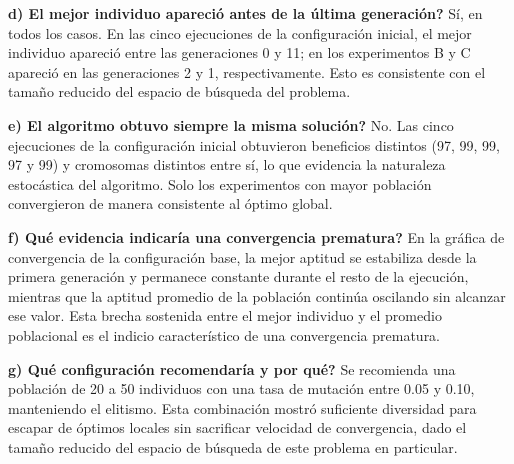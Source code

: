 \documentclass[12pt,a4paper]{article}
\begin{document}
\textbf{d) \textquestiondown El mejor individuo apareci\'{o} antes de la \'{u}ltima generaci\'{o}n?}
S\'{i}, en todos los casos. En las cinco ejecuciones de la configuraci\'{o}n
inicial, el mejor individuo apareci\'{o} entre las generaciones 0 y 11;
en los experimentos B y C apareci\'{o} en las generaciones 2 y 1,
respectivamente. Esto es consistente con el tama\~{n}o reducido del
espacio de b\'{u}squeda del problema.

\textbf{e) \textquestiondown El algoritmo obtuvo siempre la misma soluci\'{o}n?} No. Las
cinco ejecuciones de la configuraci\'{o}n inicial obtuvieron beneficios
distintos (97, 99, 99, 97 y 99) y cromosomas distintos entre s\'{i}, lo
que evidencia la naturaleza estoc\'{a}stica del algoritmo. Solo los
experimentos con mayor poblaci\'{o}n convergieron de manera consistente
al \'{o}ptimo global.

\textbf{f) \textquestiondown Qu\'{e} evidencia indicar\'{i}a una convergencia
prematura?} En la gr\'{a}fica de
convergencia de la configuraci\'{o}n base, la mejor aptitud se
estabiliza desde la primera generaci\'{o}n y permanece constante durante
el resto de la ejecuci\'{o}n, mientras que la aptitud promedio de la
poblaci\'{o}n contin\'{u}a oscilando sin alcanzar ese valor. Esta brecha
sostenida entre el mejor individuo y el promedio poblacional es el
indicio caracter\'{i}stico de una convergencia prematura.

\textbf{g) \textquestiondown Qu\'{e} configuraci\'{o}n recomendar\'{i}a y por qu\'{e}?} Se
recomienda una poblaci\'{o}n de 20
a 50 individuos con una tasa de mutaci\'{o}n entre 0.05 y 0.10,
manteniendo el elitismo. Esta combinaci\'{o}n mostr\'{o} suficiente
diversidad para escapar de \'{o}ptimos locales sin sacrificar
velocidad de convergencia, dado el tama\~{n}o reducido del espacio de
b\'{u}squeda de este problema en particular.
\end{document}
